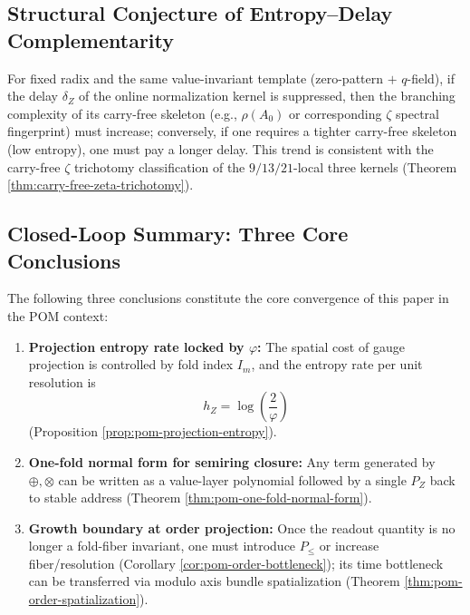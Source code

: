 \subsection{Structural Conjecture of Entropy–Delay Complementarity}\label{subsec:pom-entropy-delay}
\begin{conjecture}\label{conj:pom-entropy-delay}
For fixed radix and the same value-invariant template (zero-pattern $+$ $q$-field), if the delay $\delta_Z$ of the online normalization kernel is suppressed, then the branching complexity of its carry-free skeleton (e.g., $\rho(A_0)$ or corresponding $\zeta$ spectral fingerprint) must increase; conversely, if one requires a tighter carry-free skeleton (low entropy), one must pay a longer delay. This trend is consistent with the carry-free $\zeta$ trichotomy classification of the $9/13/21$-local three kernels (Theorem \ref{thm:carry-free-zeta-trichotomy}).
\end{conjecture}

\subsection{Closed-Loop Summary: Three Core Conclusions}\label{subsec:pom-summary}
The following three conclusions constitute the core convergence of this paper in the POM context:
\begin{enumerate}
  \item \textbf{Projection entropy rate locked by $\varphi$:} The spatial cost of gauge projection is controlled by fold index $I_m$, and the entropy rate per unit resolution is
  \[
  h_Z=\log\!\left(\frac{2}{\varphi}\right)
  \]
  (Proposition \ref{prop:pom-projection-entropy}).
  \item \textbf{One-fold normal form for semiring closure:} Any term generated by $\oplus,\otimes$ can be written as a value-layer polynomial followed by a single $P_Z$ back to stable address (Theorem \ref{thm:pom-one-fold-normal-form}).
  \item \textbf{Growth boundary at order projection:} Once the readout quantity is no longer a fold-fiber invariant, one must introduce $P_{\le}$ or increase fiber/resolution (Corollary \ref{cor:pom-order-bottleneck}); its time bottleneck can be transferred via modulo axis bundle spatialization (Theorem \ref{thm:pom-order-spatialization}).
\end{enumerate}
